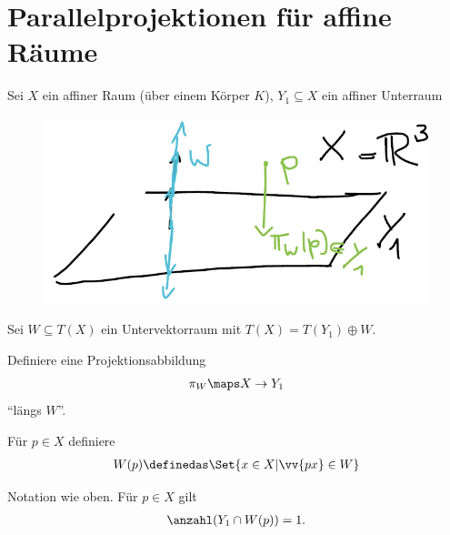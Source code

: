 \section*{Parallelprojektionen für affine Räume}
Sei \( X \) ein affiner Raum (über einem Körper \( K \)), \( Y_1\subseteq X \) ein affiner Unterraum
\begin{beispiel*}
    \begin{figure}[H]
        \centering
        \includegraphics[width=0.5\linewidth]{figures/affine_parallelprojektion_r_3}
        \label{fig:affine_parallelprojektion_r_3}
    \end{figure}
    
\end{beispiel*}
Sei \( W\subseteq T(X) \) ein Untervektorraum mit \( T(X)=T(Y_1)\oplus W \).
\begin{ziel*}
    Definiere eine Projektionsabbildung
    \begin{align*}
        \pi_W\maps X\to Y_1
    \end{align*}
    \enquote{längs \( W \)}.
\end{ziel*}
Für \( p\in X \) definiere
\begin{align*}
    W(p)\definedas\Set{x\in X| \vv{px}\in W}
\end{align*}
\begin{lemma}
    Notation wie oben.
    Für \( p\in X \) gilt
    \begin{align*}
        \anzahl(Y_1\cap W(p))=1.
    \end{align*}
\end{lemma}
